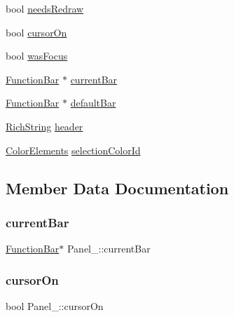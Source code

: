 \begin{DoxyCompactItemize}
bool \hyperlink{structPanel___a3abbeba973cd64068c2ee65bdedff0fa}{needs\+Redraw}
\item 
bool \hyperlink{structPanel___a198ded69d4dec805cd7d3db4545a2c60}{cursor\+On}
\item 
bool \hyperlink{structPanel___a8d2e18d7aa784ec895c900a59785917e}{was\+Focus}
\item 
\hyperlink{FunctionBar_8h_acbf21c40af2139c165bafd8061c2ceda}{Function\+Bar} $\ast$ \hyperlink{structPanel___a8c52059c2a5ec6921e925e0c417067b5}{current\+Bar}
\item 
\hyperlink{FunctionBar_8h_acbf21c40af2139c165bafd8061c2ceda}{Function\+Bar} $\ast$ \hyperlink{structPanel___ab622014e29d883de8ee4b93bd7bbacb2}{default\+Bar}
\item 
\hyperlink{RichString_8h_a39ea40ab434af42226db49eec1187e6a}{Rich\+String} \hyperlink{structPanel___abd0e7d163d48cb7abfca99124dad2925}{header}
\item 
\hyperlink{CRT_8h_acea6130e6974f0cffaa58bbcbf09372a}{Color\+Elements} \hyperlink{structPanel___a6ad80da61459f15d8c5ac5235043fdd2}{selection\+Color\+Id}
\end{DoxyCompactItemize}


\subsection{Member Data Documentation}
\mbox{\label{structPanel___a8c52059c2a5ec6921e925e0c417067b5}} 
\subsubsection{\texorpdfstring{current\+Bar}{currentBar}}
{\footnotesize\ttfamily \hyperlink{FunctionBar_8h_acbf21c40af2139c165bafd8061c2ceda}{Function\+Bar}$\ast$ Panel\+\_\+\+::current\+Bar}

\mbox{\label{structPanel___a198ded69d4dec805cd7d3db4545a2c60}} 
\subsubsection{\texorpdfstring{cursor\+On}{cursorOn}}
{\footnotesize\ttfamily bool Panel\+\_\+\+::cursor\+On}

